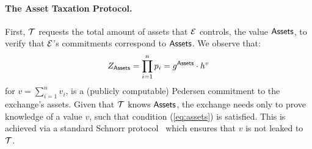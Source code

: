 \paragraph{The Asset Taxation Protocol.}\label{subsec:tax-authority-proto}

First, $\mathcal{T}$ requests the total amount of assets that $\mathcal{E}$
controls, \ie the value $\mathsf{Assets}$, to verify that $\mathcal{E}$'s
commitments correspond to $\mathsf{Assets}$. We observe that:
\begin{align}
    Z_{\mathsf{Assets}} = \prod_{i = 1}^n p_i = g^{\mathsf{Assets}} \cdot h^v \label{eq:assets}
\end{align}
for $v = {\sum_{i = 1}^n v_i}$, is a (publicly computable) Pedersen
commitment to the exchange's assets. Given that $\mathcal{T}$ knows $\mathsf{Assets}$, the
exchange needs only to prove knowledge of a value $v$, such that condition
(\ref{eq:assets}) is satisfied. This is achieved via a standard Schnorr
protocol~\cite{C:Schnorr89} which ensures that $v$ is not leaked to $\mathcal{T}$.

